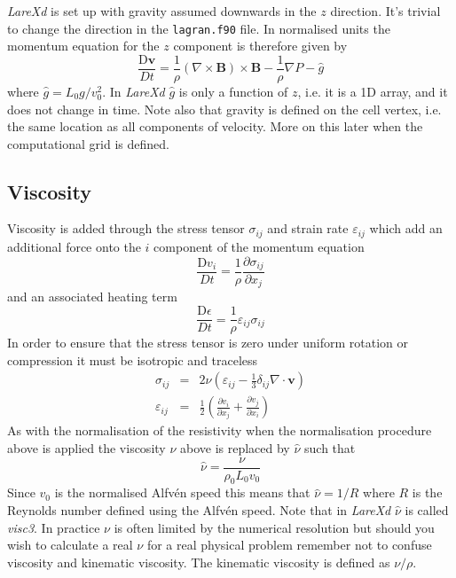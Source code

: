 \documentclass[11pt]{article}
\begin{document}
{\it LareXd} is set up with gravity assumed downwards in the $z$ direction. It's trivial to change the direction in the \texttt{lagran.f90} file. In normalised units the momentum equation for the $z$ component is therefore given by
\begin{displaymath}
 \frac{\mathrm{D}\mathbf{v}}{Dt}=\frac{1}{\rho}(\nabla\times\mathbf{B})\times\mathbf{B}
-\frac{1}{\rho}\nabla P-\hat{g}
\end{displaymath}
where $\hat{g}=L_0 g / v_0^2$. In {\it LareXd} $\hat{g}$ is only a function of $z$, i.e. it is a 1D array, and it does not change in time. Note also that gravity is defined on the cell vertex, i.e. the same location as all components of velocity. More on this later when the computational grid is defined.

\subsection{Viscosity}
Viscosity is added through the stress tensor $\sigma_{ij}$ and strain rate $\varepsilon_{ij}$ which add an additional force onto the $i$ component of the momentum equation
\begin{displaymath}
\frac{\mathrm{D}v_i}{Dt}=\frac{1}{\rho}\frac{\partial \sigma_{ij}}{\partial x_j}
\end{displaymath}
and an associated heating term
\begin{displaymath}
\frac{\mathrm{D}\epsilon}{Dt}=\frac{1}{\rho}\varepsilon_{ij}\sigma_{ij}
\end{displaymath}
In order to ensure that the stress tensor is zero under uniform rotation or compression it must be isotropic and traceless
\begin{eqnarray*}
\sigma_{ij} &=& 2 \nu \left(\varepsilon_{ij}-\frac{1}{3}\delta_{ij}\nabla\cdot\mathbf{v}\right) \\
\varepsilon_{ij} &=& \frac{1}{2}\left(\frac{\partial v_i}{\partial x_j} + \frac{\partial v_j}{\partial x_i} \right)
\end{eqnarray*}
As with the normalisation of the resistivity when the normalisation procedure above is applied the viscosity $\nu$ above is replaced by $\hat{\nu}$ such that
\begin{displaymath}
 \hat{\nu}=\frac{\nu}{\rho_0 L_0 v_0}
\end{displaymath}
Since $v_0$ is the normalised Alfv\'en speed this means that $\hat{\nu}=1/R$ where $R$ is the Reynolds number defined using the Alfv\'en speed. Note that in {\it LareXd}  $\hat{\nu}$ is called {\it visc3}. In practice $\nu$ is often limited by the numerical resolution but should you wish to calculate a real $\nu$ for a real physical problem remember not to confuse viscosity and kinematic viscosity. The kinematic viscosity is defined as $\nu/\rho$.
\end{document}
